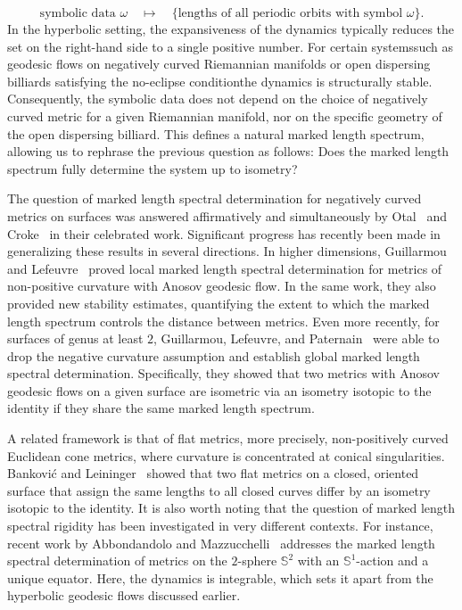 \documentclass[reqno,11pt]{amsart}
\begin{document}
$$
\text{symbolic data } \omega \quad \mapsto\quad \{\text{lengths of all periodic orbits with symbol }\omega\}. 
$$
In the hyperbolic setting, the expansiveness of the dynamics typically reduces the set on the right-hand side to a single positive number. For certain systems\textemdash such as geodesic flows on negatively curved Riemannian manifolds or open dispersing billiards satisfying the no-eclipse condition\textemdash the dynamics is structurally stable. Consequently, the symbolic data does not depend on the choice of negatively curved metric for a given Riemannian manifold, nor on the specific geometry of the open dispersing billiard.
This defines a natural marked length spectrum, allowing us to rephrase the previous question as follows:
Does the marked length spectrum fully determine the system up to isometry?

The question of marked length spectral determination for negatively curved metrics on surfaces was answered affirmatively and simultaneously by Otal~\cite{otal_spectre_1990} and Croke~\cite{croke1990rigidity} in their celebrated work. Significant progress has recently been made in generalizing these results in several directions.
In higher dimensions, Guillarmou and Lefeuvre~\cite{guillarmou_marked_2019} proved local marked length spectral determination for metrics of non-positive curvature with Anosov geodesic flow. In the same work, they also provided new stability estimates, quantifying the extent to which the marked length spectrum controls the distance between metrics.
Even more recently, for surfaces of genus at least $2$, Guillarmou, Lefeuvre, and Paternain~\cite{guillarmou2025marked} were able to drop the negative curvature assumption and establish global marked length spectral determination. Specifically, they showed that two metrics with Anosov geodesic flows on a given surface are isometric via an isometry isotopic to the identity if they share the same marked length spectrum.

A related framework is that of flat metrics, more precisely, non-positively curved Euclidean cone metrics, where curvature is concentrated at conical singularities. Banković and Leininger~\cite{bankovic_marked-length-spectral_2017} showed that two flat metrics on a closed, oriented surface that assign the same lengths to all closed curves differ by an isometry isotopic to the identity.
It is also worth noting that the question of marked length spectral rigidity has been investigated in very different contexts. For instance, recent work by Abbondandolo and Mazzucchelli~\cite{Abb_Mazz} addresses the marked length spectral determination of metrics on the $2$-sphere $\mathbb{S}^2$ with an $\mathbb{S}^1$-action and a unique equator. Here, the dynamics is integrable, which sets it apart from the hyperbolic geodesic flows discussed earlier.
\end{document}
